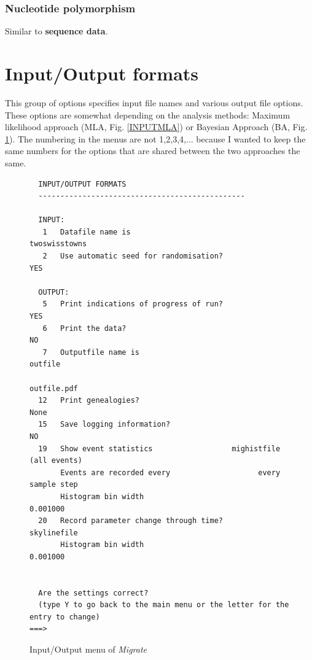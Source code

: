 \subsubsection{Nucleotide polymorphism}
Similar to {\bf sequence data}.
\vskip 1cm
\section{Input/Output formats}
This group of options specifies input file names and various output file options. These options are somewhat depending on the analysis methods: Maximum likelihood approach (MLA, Fig. \ref{INPUTMLA}) or Bayesian Approach (BA, Fig. \ref{INPUTBA}).
The numbering in the menus are not 1,2,3,4,... because I wanted to keep the same numbers for the options that are shared between the two approaches the same.
\begin{figure}[bht]

\begin{center}

\begin{boxedminipage}{14.5cm}
\begin{small}
\begin{tt}
\begin{verbatim}
  INPUT/OUTPUT FORMATS 
  -----------------------------------------------

  INPUT:
   1   Datafile name is                                  twoswisstowns
   2   Use automatic seed for randomisation?                       YES

  OUTPUT:
   5   Print indications of progress of run?                       YES
   6   Print the data?                                              NO
   7   Outputfile name is                                      outfile
                                                           outfile.pdf
  12   Print genealogies?                                         None
  15   Save logging information?                                    NO
  19   Show event statistics                  mighistfile (all events)
       Events are recorded every                    every sample step
       Histogram bin width                                    0.001000
  20   Record parameter change through time?               skylinefile
       Histogram bin width                                    0.001000


  Are the settings correct?
  (type Y to go back to the main menu or the letter for the entry to change)
===>\end{verbatim}
\end{tt}
\end{small}
\end{boxedminipage}

\end{center}

\caption{{\sf Input/Output menu of {\it Migrate}}}
\label{INPUTBA}
\end{figure}

